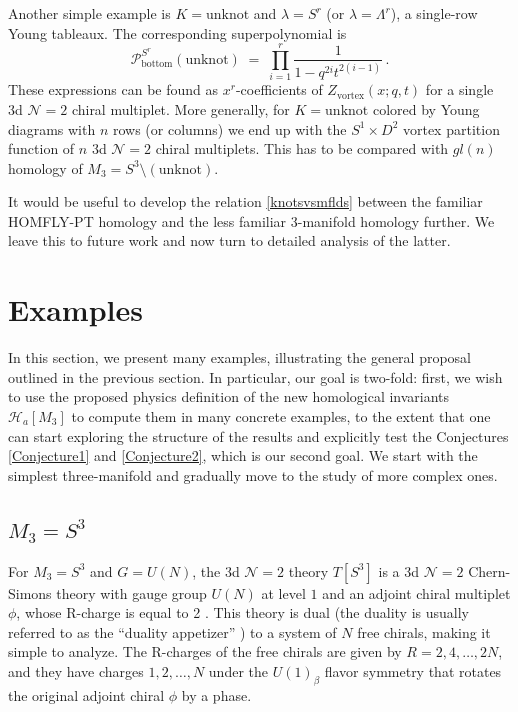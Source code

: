 \documentclass[hyper,letterpaper]{JHEP3}
\newcommand{\be}{\begin{equation}}
\newcommand{\ee}{\end{equation}}
\def\CH{{\mathcal H}}
\def\CN{{\mathcal N}}
\def\CP{{\mathcal P}}
\begin{document}
Another simple example is $K = \text{unknot}$ and $\lambda = S^r$ (or $\lambda = \Lambda^r$),
a single-row Young tableaux. The corresponding superpolynomial is
\be
\CP^{S^r}_{\text{bottom}} (\text{unknot}) \; = \; \prod_{i=1}^r \frac{1}{1-q^{2i} t^{2(i-1)}} \,.
\label{SrHOMFLY}
\ee
These expressions can be found as $x^r$-coefficients of $Z_{\text{vortex}} (x;q,t)$ for a single 3d $\CN=2$ chiral multiplet.
More generally, for $K = \text{unknot}$ colored by Young diagrams with $n$ rows (or columns)
we end up with the $S^1 \times D^2$ vortex partition function of $n$ 3d $\CN=2$ chiral multiplets.
This has to be compared with $gl(n)$ homology of $M_3 = S^3 \setminus (\text{unknot})$.

It would be useful to develop the relation \eqref{knotsvsmflds} between the familiar HOMFLY-PT homology and the less
familiar 3-manifold homology further. We leave this to future work and now turn to detailed analysis of the latter.


\section{Examples}

In this section, we present many examples, illustrating the general proposal outlined in the previous section.
In particular, our goal is two-fold:
first, we wish to use the proposed physics definition of the new homological invariants $\CH_a[M_3]$
to compute them in many concrete examples, to the extent that one can start exploring the structure
of the results and explicitly test the Conjectures \ref{Conjecture1} and \ref{Conjecture2}, which is our second goal.
We start with the simplest three-manifold and gradually move to the study of more complex ones.

\subsection{${M_3=S^3}$}\label{sec:S3}

For $M_3=S^3$ and $G=U(N)$, the 3d $\CN=2$ theory $T[S^3]$ is a 3d $\CN=2$ Chern-Simons theory with gauge group $U(N)$ at level $1$ and an adjoint chiral multiplet $\phi$, whose R-charge is equal to 2 \cite{equivariant}. This theory is dual (the duality is usually referred to as the ``duality appetizer'' \cite{Jafferis:2011ns,Kapustin:2011vz,appetizer}) to a system of $N$ free chirals, making it simple to analyze. The R-charges of the free chirals are given by $R=2,4,\ldots, 2N$, and they have charges $1, 2,\ldots, N$ under the $U(1)_{\beta}$ flavor symmetry that rotates the original adjoint chiral $\phi$ by a phase.
\end{document}
